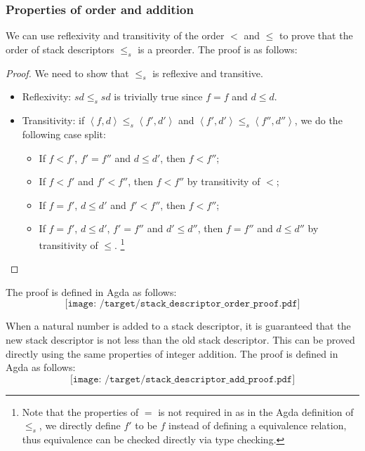 \documentclass[12pt,a4paper]{report}
\theoremstyle{definition}
\newcommand{\ang}[1]{\left\langle #1 \right\rangle}
\begin{document}
    \subsubsection{Properties of order and addition}
    We can use reflexivity and transitivity of the order $<$ and $\leq$ to prove that the order of stack descriptors $\leq_s$ is a preorder. The proof is as follows:
    \begin{proof}
        We need to show that $\leq_s$ is reflexive and transitive. 
        \begin{itemize}
            \item 
                Reflexivity: $sd \leq_s sd$ is trivially true since $f = f$ and $d \leq d$.
            \item
                Transitivity: if $\ang{f, d} \leq_s \ang{f', d'}$ and $\ang{f', d'} \leq_s \ang{f'', d''}$, we do the following case split:
                \begin{itemize}
                    \item 
                        If $f < f'$, $f' = f''$ and $d \leq d'$, then $f < f''$; 
                    \item 
                        If $f < f'$ and $f' < f''$, then $f < f''$ by transitivity of $<$;
                    \item
                        If $f = f'$, $d \leq d'$ and $f' < f''$, then $f < f''$;
                    \item
                        If $f = f'$, $d \leq d'$, $f' = f''$ and $d' \leq d''$, then $f = f''$ and $d \leq d''$ by transitivity of $\leq$. \footnote{Note that the properties of $=$ is not required in as in the Agda definition of $\leq_s$, we directly define $f'$ to be $f$ instead of defining a equivalence relation, thus equivalence can be checked directly via type checking.}
                \end{itemize}
        \end{itemize}
    \end{proof}

    The proof is defined in Agda as follows:
    \[\texttt{[image: /target/stack\_descriptor\_order\_proof.pdf]}\]

    When a natural number is added to a stack descriptor, it is guaranteed that the new stack descriptor is not less than the old stack descriptor. This can be proved directly using the same properties of integer addition. The proof is defined in Agda as follows:
    \[\texttt{[image: /target/stack\_descriptor\_add\_proof.pdf]}\]
\end{document}
